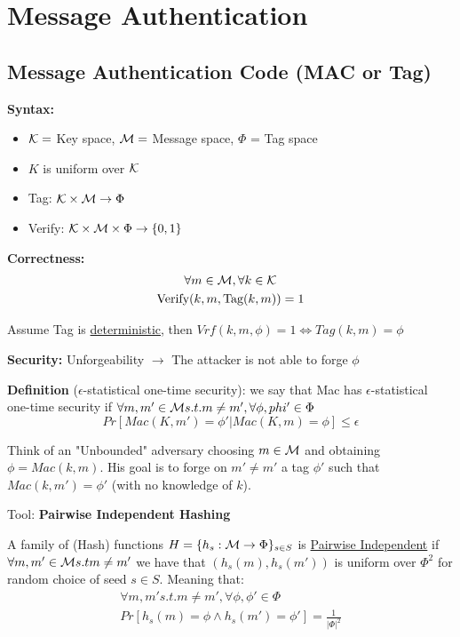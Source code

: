 
\section{Message Authentication}

\subsection{Message Authentication Code (MAC or Tag)}

\textbf{Syntax:}

\begin{itemize}
    \item $\mathcal{K} =$ Key space, $\mathcal{M}=$ Message space, $\Phi$ = Tag space
    \item $K$ is uniform over $\mathcal{K}$
    \item Tag: $\mathcal{K} \times \mathcal{M} \to \Phi$
    \item Verify: $\mathcal{K} \times \mathcal{M} \times \Phi \to \{0,1\}$
\end{itemize}

\textbf{Correctness:}
\begin{gather*}
    \forall m \in \mathcal{M}, \forall k \in \mathcal{K} \\
    \text{Verify}(k,m,\text{Tag}(k,m))=1    
\end{gather*}

Assume Tag is \underline{deterministic}, then $Vrf(k,m,\phi)=1 \Leftrightarrow Tag(k,m)=\phi$

\noindent\textbf{Security:} Unforgeability $\rightarrow$ The attacker is not able to forge $\phi$

\noindent\textbf{Definition} ($\epsilon$-statistical one-time security): we say that Mac has $\epsilon$-statistical one-time security if
$\forall m,m' \in \mathcal{M} s.t. m\neq m', \forall \phi,phi' \in \Phi$
$$Pr[Mac(K,m')=\phi'|Mac(K,m)=\phi]\leq \epsilon$$

\noindent Think of an "Unbounded" adversary choosing $m \in \mathcal{M}$ and obtaining $\phi=Mac(k,m)$. His goal is to forge on $m'\neq m'$ a tag $\phi'$ such that $Mac(k,m')=\phi'$ (with no knowledge of $k$).

\bigskip
Tool:\textbf{ Pairwise Independent Hashing} 
\begin{definition}
    A family of (Hash) functions $H=\{h_s:\mathcal{M} \to \Phi\}_{s\in S}$ is \underline{Pairwise Independent} if $\forall m,m' \in \mathcal{M} s.t m\neq m'$ we have that $(h_s(m),h_s(m'))$ is uniform over $\Phi^2$ for random choice of seed $s \in S$. Meaning that:
    \begin{gather*}
        \forall m,m' s.t. m\neq m',\forall \phi,\phi' \in \Phi \\
        Pr[h_s(m)=\phi \wedge h_s(m')=\phi']=\frac{1}{|\Phi|^2}
    \end{gather*}
\end{definition}

